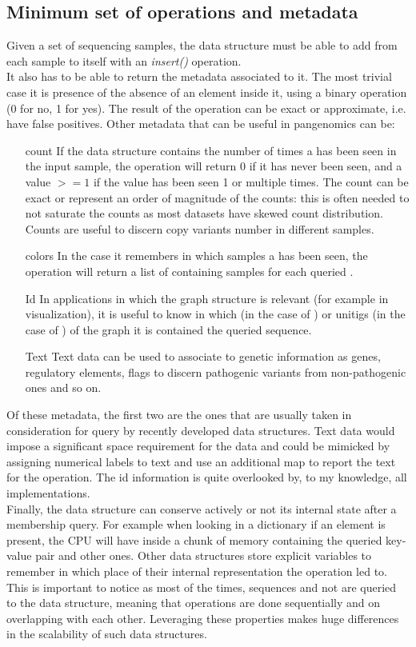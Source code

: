 \subsection{Minimum set of operations and metadata}
Given a set of sequencing samples, the data structure must be able to add \kmers from each sample to itself with an \emph{insert()} operation. \\
It also has to be able to return the metadata associated to it. The most trivial case it is presence of the absence of an element inside it, using a binary \memb operation (0 for no, 1 for yes). The result of the \memb operation can be exact or approximate, i.e. have false positives. Other metadata that can be useful in pangenomics can be:
\begin{itemize}
	\item[count] If the data structure contains the number of times a \kmer has been seen in the input sample, the \memb operation will return 0 if it has never been seen, and a value $>= 1$ if the value has been seen 1 or multiple times. The count can be exact or represent an order of magnitude of the counts: this is often needed to not saturate the counts as most datasets have skewed \kmer count distribution. Counts are useful to discern copy variants number in different samples.
	\item[colors] In the case it remembers in which samples a \kmer has been seen, the \memb operation will return a list of containing samples for each queried \kmer. 
	\item[Id] In applications in which the graph structure is relevant (for example in visualization), it is useful to know in which \kmers (in the case of \dbg) or unitigs (in the case of \cdbg) of the graph it is contained the queried sequence.
	\item[Text] Text data can be used to associate \kmers to genetic information as genes, regulatory elements, flags to discern pathogenic variants from non-pathogenic ones and so on.
\end{itemize}
Of these metadata, the first two are the ones that are usually taken in consideration for query by recently developed data structures. Text data would impose a significant space requirement for the data and could be mimicked by assigning numerical labels to text and use an additional map to report the text for the \memb operation. The id information is quite overlooked by, to my knowledge, all implementations.\\ 
Finally, the data structure can conserve actively or not its internal state after a membership query. For example when looking in a dictionary if an element is present, the CPU will have inside a chunk of memory containing the queried key-value pair and other ones. Other data structures store explicit variables to remember in which place of their internal representation the \memb operation led to. This is important to notice as most of the times, sequences and not \kmers are queried to the data structure, meaning that \memb operations are done sequentially and on \kmers overlapping with each other. Leveraging these properties makes huge differences in the scalability of such data structures.

